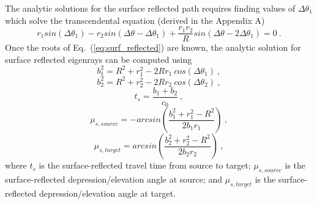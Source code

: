\documentclass{ws-jca}
\begin{document}
The analytic solutions for the surface reflected path requires finding
values of \( \Delta \theta_1 \) which solve the transcendental equation
(derived in the Appendix A)
\begin{equation}
	r_1 sin( \Delta \theta_1 ) - r_2 sin( \Delta \theta - \Delta \theta_1 ) 
		+ \frac{r_1 r_2}{R} sin( \Delta \theta - 2 \Delta \theta_1 ) = 0 \:.
	\label{eq:surf_reflected}
\end{equation}
Once the roots of Eq.~(\ref{eq:surf_reflected}) are known, the analytic
solution for surface reflected eigenrays can be computed using
\begin{equation}
	b_1^2 = R^2 + r_1^2 - 2 R r_1 \: cos( \Delta \theta_1 ) \:,
	\label{eq:eigenray_lloyds_a1}
\end{equation}
\begin{equation}
	b_2^2 = R^2 + r_2^2 - 2 R r_2 \: cos( \Delta \theta_2 ) \:,
	\label{eigenray_lloyds_analyticeq:eigenray_lloyds_a2}
\end{equation}
\begin{equation}
	t_s = \frac{ b_1 + b_2 }{c_0} \:,
	\label{eq:eigenray_lloyds_tsurface}
\end{equation}
\begin{equation}
	\mu_{s,source} = - arcsin \left( \frac{b_1^2+r_1^2-R^2}{2 b_1 r_1} \right) \:,
	\label{eq:eigenray_lloyds_eta1}
\end{equation}
\begin{equation}
	\mu_{s,target} = arcsin \left( \frac{b_2^2+r_2^2-R^2}{2 b_2 r_2} \right) \:,
	\label{eq:eigenray_lloyds_eta2}
\end{equation}
where
\( t_s \) is the surface-reflected travel time from source to target;
\( \mu_{s,source} \) is the surface-reflected depression/elevation angle at source; and
\( \mu_{s,target} \) is the surface-reflected depression/elevation angle at target.
\end{document}

